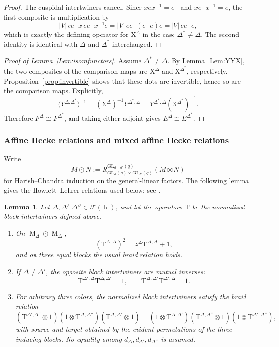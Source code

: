 \documentclass[12pt]{amsart}
\numberwithin{itemcounter}{subsection}
\theoremstyle{plain}
\newtheorem{lemma}[theorem]{Lemma}
\theoremstyle{definition}
\theoremstyle{remark}
\numberwithin{equation}{section}
\def\k{\Bbbk}
\def\calF{\mathcal{F}}
\def\GL{\mathrm{GL}}
\def\M{{\operatorname{M}\nolimits}}
\begin{document}
\begin{proof}
The cuspidal intertwiners cancel.  Since
$xex^{-1}=e^-$ and $xe^-x^{-1}=e$, the first composite is multiplication by
\[
|V|\,ee^-x\,ee^-x^{-1}e
 =|V|\,ee^-(e^-e)e
 =|V|\,ee^-e,
\]
which is exactly the defining operator for $\mathrm{X}^\Delta$ in the case
$\Delta^*\ne\Delta$.  The second identity is identical with
$\Delta$ and $\Delta^*$ interchanged.
\end{proof}

\begin{proof}[Proof of Lemma~\ref{Lem:isomfunctors}]
Assume $\Delta^*\ne\Delta$.  By Lemma~\ref{Lem:YYX}, the two composites of
the comparison maps are $\mathrm{X}^\Delta$ and $\mathrm{X}^{\Delta^*}$, respectively.
Proposition~\ref{prop:invertible} shows that these dots are invertible, hence
so are the comparison maps.  Explicitly,
\[
\bigl(Y^{\Delta,\Delta^*}\bigr)^{-1}
=(\mathrm{X}^\Delta)^{-1}Y^{\Delta^*,\Delta}
=Y^{\Delta^*,\Delta}(\mathrm{X}^{\Delta^*})^{-1}.
\]
Therefore $F^\Delta\cong F^{\Delta^*}$, and taking either adjoint gives
$E^\Delta\cong E^{\Delta^*}$.
\end{proof}

\subsubsection{Affine Hecke relations and mixed affine Hecke relations}\label{subsec:repdatumN}

Write
\[
M\odot N:=R^{\GL_{d+d'}(q)}_{\GL_d(q)\times\GL_{d'}(q)}(M\boxtimes N)
\]
for Harish--Chandra induction on the general-linear factors.  The following
lemma gives the Howlett--Lehrer relations used below; see \cite{HL80}.

\begin{lemma}\label{lem:HLintertwiners}
Let \(\Delta,\Delta',\Delta''\in\calF(\k)\), and let the operators \(\mathrm{T}\) be
the normalized block intertwiners defined above.
\begin{enumerate}
\item[(1)] On \(\M_\Delta\odot\M_\Delta\),
\[
(\mathrm{T}^{\Delta,\Delta})^2=z^\Delta \mathrm{T}^{\Delta,\Delta}+1,
\]
and on three equal blocks the usual braid relation holds.
\item[(2)] If \(\Delta\ne\Delta'\), the opposite block intertwiners are
mutual inverses:
\[
\mathrm{T}^{\Delta',\Delta}\mathrm{T}^{\Delta,\Delta'}=1,
\qquad
\mathrm{T}^{\Delta,\Delta'}\mathrm{T}^{\Delta',\Delta}=1.
\]
\item[(3)] For arbitrary three colors, the normalized block intertwiners
satisfy the braid relation
\[
(\mathrm{T}^{\Delta',\Delta''}\otimes1)
(1\otimes \mathrm{T}^{\Delta,\Delta''})
(\mathrm{T}^{\Delta,\Delta'}\otimes1)
=
(1\otimes \mathrm{T}^{\Delta,\Delta'})
(\mathrm{T}^{\Delta,\Delta''}\otimes1)
(1\otimes \mathrm{T}^{\Delta',\Delta''}),
\]
with source and target obtained by the evident permutations of the three
inducing blocks.  No equality among \(d_\Delta,d_{\Delta'},d_{\Delta''}\) is
assumed.
\end{enumerate}
\end{lemma}
\end{document}
